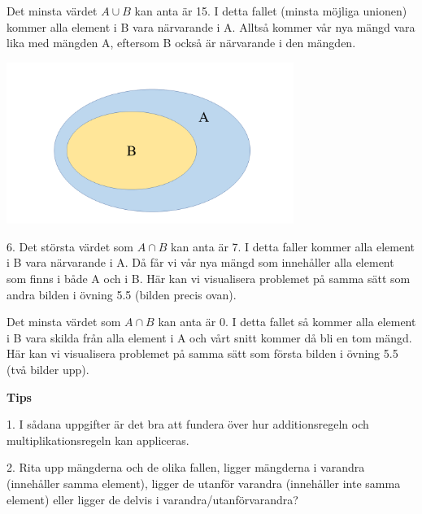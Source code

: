 \documentclass{tufte-handout}
\begin{document}
\begin{xca}
 Det minsta värdet $A \cup B$ kan anta är 15. I detta fallet (minsta möjliga unionen) kommer alla element i B vara närvarande i A. Alltså kommer vår nya mängd vara lika med mängden A, eftersom B också är närvarande i den mängden. 
 \begin{center}
    \includegraphics[width=0.7\textwidth]{graphics/mangimangdA.png}
 \end{center}

 \addlinespace

 6. Det största värdet som $A \cap B$ kan anta är 7. I detta faller kommer alla element i B vara närvarande i A. Då får vi vår nya mängd som innehåller alla element som finns i både A och i B. 
 Här kan vi visualisera problemet på samma sätt som andra bilden i övning 5.5 (bilden precis ovan).

 Det minsta värdet som $A \cap B$ kan anta är 0. I detta fallet så kommer alla element i B vara skilda från alla element i A och vårt snitt kommer då bli en tom mängd. 
 Här kan vi visualisera problemet på samma sätt som första bilden i övning 5.5 (två bilder upp).
\addlinespace

\noindent\textbf{Tips}

1. I sådana uppgifter är det bra att fundera över hur additionsregeln och multiplikationsregeln kan appliceras. 

2. Rita upp mängderna och de olika fallen, ligger mängderna i varandra (innehåller samma element), ligger de utanför varandra (innehåller inte samma element) eller ligger de delvis i varandra/utanförvarandra?

\end{xca}
\end{document}
